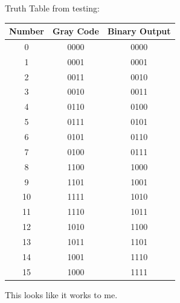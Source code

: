 \documentclass[12pt]{article}
\begin{document}
Truth Table from testing:
\begin{center}
    \begin{tabular}{| c | c c |}
        \hline
        \textbf{Number} & \textbf{Gray Code} & \textbf{Binary Output} \\
        \hline\hline
        0 & 0000 & 0000 \\
        1 & 0001 & 0001 \\
        2 & 0011 & 0010 \\
        3 & 0010 & 0011 \\
        4 & 0110 & 0100 \\
        5 & 0111 & 0101 \\
        6 & 0101 & 0110 \\
        7 & 0100 & 0111 \\
        8 & 1100 & 1000 \\
        9 & 1101 & 1001 \\
        10 & 1111 & 1010 \\
        11 & 1110 & 1011 \\
        12 & 1010 & 1100 \\
        13 & 1011 & 1101 \\
        14 & 1001 & 1110 \\
        15 & 1000 & 1111 \\
        \hline
    \end{tabular}
\end{center}

This looks like it works to me.
\end{document}
